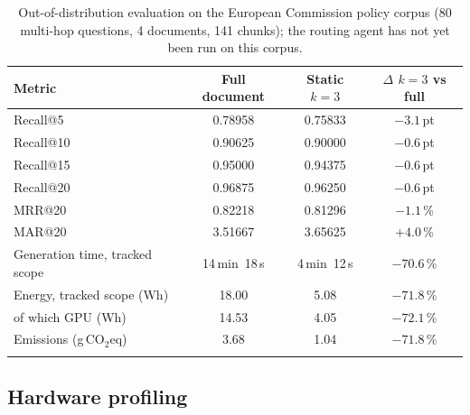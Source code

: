 \documentclass[pdflatex,sn-mathphys-num]{sn-jnl}
\makeatletter
\newcommand{\gco}{g\,CO$_2$eq}
\newcommand{\Rec}[1]{Recall@#1}
\newcommand{\MRR}[1]{MRR@#1}
\newcommand{\MAR}[1]{MAR@#1}
\theoremstyle{thmstyleone}%
\theoremstyle{thmstylethree}%
\makeatother
\begin{document}
\begin{table}[htbp]
\caption{Out-of-distribution evaluation on the European Commission policy corpus (80 multi-hop questions, 4 documents, 141 chunks); the routing agent has not yet been run on this corpus.}\label{tab:policy}
\begin{tabular}{@{}lccc@{}}
\toprule
Metric & Full document & Static $k=3$ & $\Delta$ $k=3$ vs full \\
\midrule
\Rec{5} & 0.78958 & 0.75833 & $-3.1$\,pt \\
\Rec{10} & 0.90625 & 0.90000 & $-0.6$\,pt \\
\Rec{15} & 0.95000 & 0.94375 & $-0.6$\,pt \\
\Rec{20} & 0.96875 & 0.96250 & $-0.6$\,pt \\
\MRR{20} & 0.82218 & 0.81296 & $-1.1$\,\% \\
\MAR{20} & 3.51667 & 3.65625 & $+4.0$\,\% \\
Generation time, tracked scope & 14\,min~18\,s & 4\,min~12\,s & $-70.6$\,\% \\
Energy, tracked scope (Wh) & 18.00 & 5.08 & $-71.8$\,\% \\
\quad of which GPU (Wh) & 14.53 & 4.05 & $-72.1$\,\% \\
Emissions (\gco{}) & 3.68 & 1.04 & $-71.8$\,\% \\
\botrule
\end{tabular}
\end{table}

\subsection{Hardware profiling}\label{sec:profiling}
\end{document}
